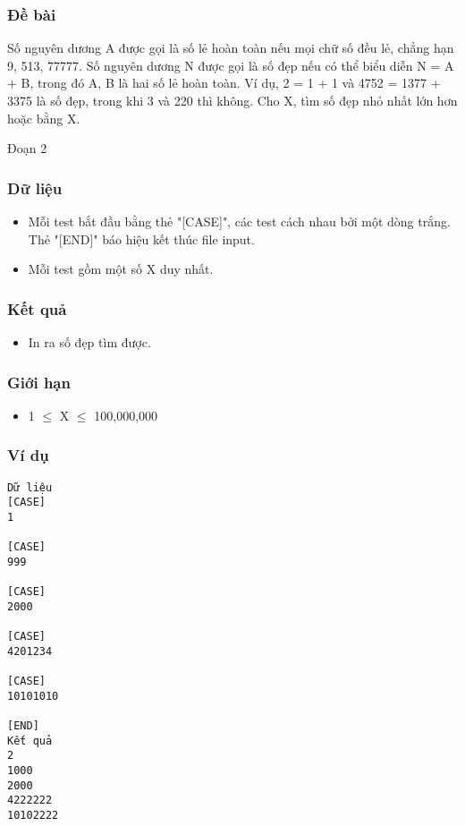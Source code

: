 



\subsubsection{   Đề bài  }

   Số nguyên dương A được gọi là số lẻ hoàn toàn nếu mọi chữ số đều lẻ, chẳng hạn 9, 513, 77777. Số nguyên dương N được gọi là số đẹp nếu có thể biểu diễn N = A + B, trong đó A, B là hai số lẻ hoàn toàn. Ví dụ, 2 = 1 + 1 và 4752 = 1377 + 3375 là số đẹp, trong khi 3 và 220 thì không. Cho X, tìm số đẹp nhỏ nhất lớn hơn hoặc bằng X.  

   Đoạn 2  

\subsubsection{   Dữ liệu  }
\begin{itemize}
	\item     Mỗi test bắt đầu bằng thẻ "[CASE]", các test cách nhau bởi một dòng trắng. Thẻ "[END]" báo hiệu kết thúc file input.   
	\item     Mỗi test gồm một số X duy nhất.   
\end{itemize}

\subsubsection{   Kết quả  }
\begin{itemize}
	\item     In ra số đẹp tìm được.   
\end{itemize}

\subsubsection{   Giới hạn  }
\begin{itemize}
	\item     1  $\le$  X  $\le$  100,000,000   
\end{itemize}

\subsubsection{   Ví dụ  }
\begin{verbatim}
Dữ liệu
[CASE]
1

[CASE]
999

[CASE]
2000

[CASE]
4201234

[CASE]
10101010

[END]
Kết quả
2
1000
2000
4222222
10102222
\end{verbatim}
